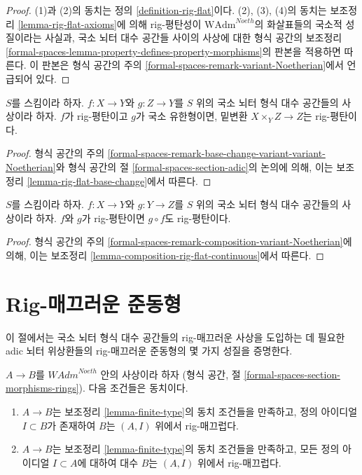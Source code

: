 \begin{proof}
(1)과 (2)의 동치는 정의 \ref{definition-rig-flat}이다.
(2), (3), (4)의 동치는 보조정리 \ref{lemma-rig-flat-axioms}에 의해
rig-평탄성이 $\text{WAdm}^{Noeth}$의 화살표들의 국소적 성질이라는 사실과,
국소 뇌터 대수 공간들 사이의 사상에 대한 형식 공간의 보조정리
\ref{formal-spaces-lemma-property-defines-property-morphisms}의 판본을
적용하면 따른다. 이 판본은 형식 공간의 주의
\ref{formal-spaces-remark-variant-Noetherian}에서 언급되어 있다.
\end{proof}

\begin{lemma}
\label{lemma-base-change-rig-flat}
$S$를 스킴이라 하자. $f : X \to Y$와 $g : Z \to Y$를
$S$ 위의 국소 뇌터 형식 대수 공간들의 사상이라 하자.
$f$가 rig-평탄이고 $g$가 국소 유한형이면, 밑변환
$X \times_Y Z \to Z$는 rig-평탄이다.
\end{lemma}

\begin{proof}
형식 공간의 주의
\ref{formal-spaces-remark-base-change-variant-variant-Noetherian}와
형식 공간의 절 \ref{formal-spaces-section-adic}의 논의에 의해,
이는 보조정리 \ref{lemma-rig-flat-base-change}에서 따른다.
\end{proof}

\begin{lemma}
\label{lemma-composition-rig-flat}
$S$를 스킴이라 하자. $f : X \to Y$와 $g : Y \to Z$를
$S$ 위의 국소 뇌터 형식 대수 공간들의 사상이라 하자.
$f$와 $g$가 rig-평탄이면 $g \circ f$도 rig-평탄이다.
\end{lemma}

\begin{proof}
형식 공간의 주의
\ref{formal-spaces-remark-composition-variant-Noetherian}에 의해,
이는 보조정리 \ref{lemma-composition-rig-flat-continuous}에서 따른다.
\end{proof}

\section{Rig-매끄러운 준동형}
\label{section-rig-smooth-homomorphisms}

\noindent
이 절에서는 국소 뇌터 형식 대수 공간들의 rig-매끄러운 사상을
도입하는 데 필요한 adic 뇌터 위상환들의 rig-매끄러운 준동형의
몇 가지 성질을 증명한다.

\begin{lemma}
\label{lemma-rig-smooth-continuous}
$A \to B$를 $\textit{WAdm}^{Noeth}$ 안의 사상이라 하자
(형식 공간, 절 \ref{formal-spaces-section-morphisms-rings}).
다음 조건들은 동치이다.
\begin{enumerate}
\item[(a)] $A \to B$는 보조정리 \ref{lemma-finite-type}의 동치 조건들을
만족하고, 정의 아이디얼 $I \subset B$가 존재하여 $B$는
$(A, I)$ 위에서 rig-매끄럽다.
\item[(b)] $A \to B$는 보조정리 \ref{lemma-finite-type}의 동치 조건들을
만족하고, 모든 정의 아이디얼 $I \subset A$에 대하여 대수 $B$는
$(A, I)$ 위에서 rig-매끄럽다.
\end{enumerate}
\end{lemma}

